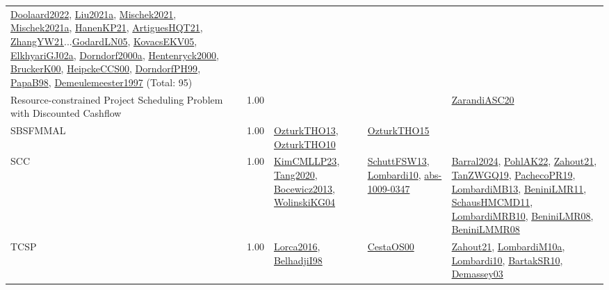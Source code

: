 {\begin{longtable}{p{3cm}r>{\raggedright\arraybackslash}p{6cm}>{\raggedright\arraybackslash}p{6cm}>{\raggedright\arraybackslash}p{8cm}}
\hyperref[detail:Doolaard2022]{Doolaard2022}, \hyperref[detail:Liu2021a]{Liu2021a}, \hyperref[detail:Mischek2021]{Mischek2021}, \hyperref[detail:Mischek2021a]{Mischek2021a}, \hyperref[detail:HanenKP21]{HanenKP21}, \hyperref[detail:ArtiguesHQT21]{ArtiguesHQT21}, \hyperref[detail:ZhangYW21]{ZhangYW21}...\hyperref[detail:GodardLN05]{GodardLN05}, \hyperref[detail:KovacsEKV05]{KovacsEKV05}, \hyperref[detail:ElkhyariGJ02a]{ElkhyariGJ02a}, \hyperref[detail:Dorndorf2000a]{Dorndorf2000a}, \hyperref[detail:Hentenryck2000]{Hentenryck2000}, \hyperref[detail:BruckerK00]{BruckerK00}, \hyperref[detail:HeipckeCCS00]{HeipckeCCS00}, \hyperref[detail:DorndorfPH99]{DorndorfPH99}, \hyperref[detail:PapaB98]{PapaB98}, \hyperref[detail:Demeulemeester1997]{Demeulemeester1997} (Total: 95)\\
\index{Resource-constrained Project Scheduling Problem with Discounted Cashflow}\index{Classification!Resource-constrained Project Scheduling Problem with Discounted Cashflow}Resource-constrained Project Scheduling Problem with Discounted Cashflow &  1.00 &  &  & \hyperref[detail:ZarandiASC20]{ZarandiASC20}\\
\index{SBSFMMAL}\index{Classification!SBSFMMAL}SBSFMMAL &  1.00 & \hyperref[detail:OzturkTHO13]{OzturkTHO13}, \hyperref[detail:OzturkTHO10]{OzturkTHO10} & \hyperref[detail:OzturkTHO15]{OzturkTHO15} & \\
\index{SCC}\index{Classification!SCC}SCC &  1.00 & \hyperref[detail:KimCMLLP23]{KimCMLLP23}, \hyperref[detail:Tang2020]{Tang2020}, \hyperref[detail:Bocewicz2013]{Bocewicz2013}, \hyperref[detail:WolinskiKG04]{WolinskiKG04} & \hyperref[detail:SchuttFSW13]{SchuttFSW13}, \hyperref[detail:Lombardi10]{Lombardi10}, \hyperref[detail:abs-1009-0347]{abs-1009-0347} & \hyperref[detail:Barral2024]{Barral2024}, \hyperref[detail:PohlAK22]{PohlAK22}, \hyperref[detail:Zahout21]{Zahout21}, \hyperref[detail:TanZWGQ19]{TanZWGQ19}, \hyperref[detail:PachecoPR19]{PachecoPR19}, \hyperref[detail:LombardiMB13]{LombardiMB13}, \hyperref[detail:BeniniLMR11]{BeniniLMR11}, \hyperref[detail:SchausHMCMD11]{SchausHMCMD11}, \hyperref[detail:LombardiMRB10]{LombardiMRB10}, \hyperref[detail:BeniniLMR08]{BeniniLMR08}, \hyperref[detail:BeniniLMMR08]{BeniniLMMR08}\\
\index{TCSP}\index{Classification!TCSP}TCSP &  1.00 & \hyperref[detail:Lorca2016]{Lorca2016}, \hyperref[detail:BelhadjiI98]{BelhadjiI98} & \hyperref[detail:CestaOS00]{CestaOS00} & \hyperref[detail:Zahout21]{Zahout21}, \hyperref[detail:LombardiM10a]{LombardiM10a}, \hyperref[detail:Lombardi10]{Lombardi10}, \hyperref[detail:BartakSR10]{BartakSR10}, \hyperref[detail:Demassey03]{Demassey03}\\

\end{longtable}}
